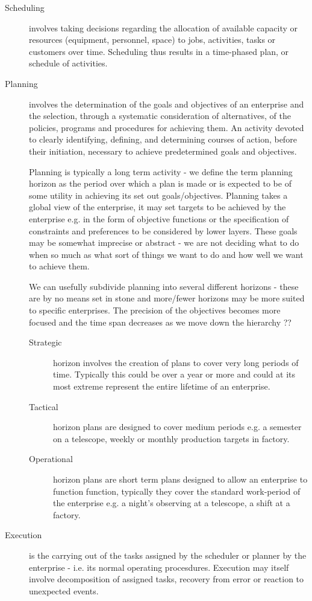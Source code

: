 \begin{description}
\item[Scheduling] involves taking decisions regarding the allocation of available capacity or resources (equipment, personnel, space) to jobs, activities, tasks or customers over time. Scheduling thus results in a time-phased plan, or schedule of activities.

\item[Planning] involves the determination of the goals and objectives of an enterprise and the selection, through a systematic consideration of alternatives, of the policies, programs and procedures for achieving them. An activity devoted to clearly identifying, defining, and determining courses of action, before their initiation, necessary to achieve predetermined goals and objectives.

Planning is typically a long term activity - we define the term planning horizon as the period over which a plan is made or is expected to be of some utility in achieving its set out goals/objectives. Planning takes a global view of the enterprise, it may set targets to be achieved by the enterprise e.g. in the form of objective functions or the specification of constraints and preferences to be considered by lower layers. These goals may be somewhat imprecise or abstract - we are not deciding what to do when so much as what sort of things we want to do and how well we want to achieve them. 

We can usefully subdivide planning into several different horizons \cite{xxx} - these are by no means set in stone and more/fewer horizons may be more suited to specific enterprises. The precision of the objectives becomes more focused and the time span decreases as we move down the hierarchy \cite{chien00aspen}??

\begin{description}
\item[Strategic] horizon involves the creation of plans to cover very long periods of time. Typically this could be over a year or more and could at its most extreme represent the entire lifetime of an enterprise. 
\item[Tactical] horizon plans are designed to cover medium periods e.g. a semester on a telescope,  weekly or monthly production targets in factory.
\item[Operational] horizon plans are short term plans designed to allow an enterprise to function function, typically they cover the standard work-period of the enterprise e.g. a night's observing at a telescope, a shift at a factory.
\end{description}

\item[Execution] is the carrying out of the tasks assigned by the scheduler or planner by the enterprise - i.e. its normal operating procesdures. Execution may itself involve decomposition of assigned tasks, recovery from error or reaction to unexpected events.


\end{description}

